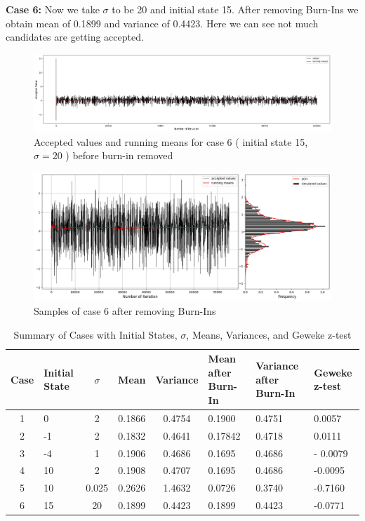 \begin{example}
    \textbf{Case 6:} Now we take $ \sigma $ to be 20 and initial state 15. After removing Burn-Ins we obtain mean of 0.1899 and variance of 0.4423. Here we can see not much candidates are getting accepted.

    \begin{figure}[H]
        \centering
        \includegraphics[width=1\textwidth]{./images/metropolis/sample-6-values.png}
        \caption{Accepted values and running means for case 6 ( initial state 15, $ \sigma = 20 $ ) before burn-in removed}
    \end{figure}

    \begin{figure}[H]
        \centering
        \includegraphics[width=1\textwidth]{./images/metropolis/sample-6-value-hist-bo.png}
        \caption{Samples of case 6 after removing Burn-Ins}
    \end{figure}

    \begin{table}[ht]
        \centering
        \begin{tabular}{|c|p{2cm}|c|c|c|p{2cm}|p{2cm}|p{2cm}|}
            \hline
            Case & Initial State & $\sigma$ & Mean & Variance & Mean after Burn-In & Variance after Burn-In & Geweke z-test \\ \hline
            1 & 0 & 2 & 0.1866 & 0.4754 & 0.1900 & 0.4751 & 0.0057 \\ \hline
            2 & -1 & 2 & 0.1832 & 0.4641 & 0.17842 & 0.4718 & 0.0111 \\ \hline
            3 & -4 & 1 & 0.1906 & 0.4686 & 0.1695 & 0.4686 & - 0.0079 \\ \hline
            4 & 10 & 2 & 0.1908 & 0.4707 & 0.1695 & 0.4686 & -0.0095 \\ \hline
            5 & 10 & 0.025 & 0.2626 & 1.4632 & 0.0726 & 0.3740 & -0.7160 \\ \hline
            6 & 15 & 20 & 0.1899 & 0.4423 & 0.1899 & 0.4423 & -0.0771 \\ \hline
        \end{tabular}
        \caption{Summary of Cases with Initial States, $\sigma$, Means, Variances, and Geweke z-test}
    \end{table}


\end{example}
